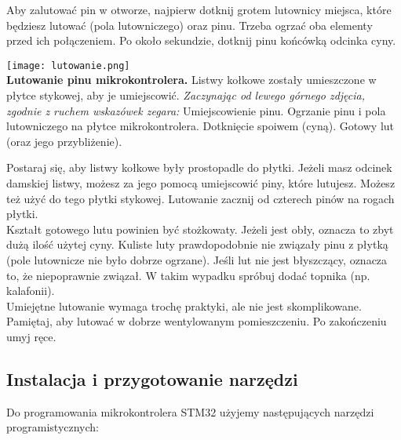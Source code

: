 \documentclass{pdfBooklets}
\begin{document}
Aby zalutować pin w otworze, najpierw dotknij grotem lutownicy
miejsca, które będziesz lutować (pola lutowniczego) oraz pinu. Trzeba ogrzać oba elementy przed ich połączeniem. Po około sekundzie, dotknij pinu końcówką odcinka cyny.
\\


\begin{Ramka}{}\begin{center}
  {\noindent\texttt{[image: lutowanie.png]}}\\
  \small
  \textbf{Lutowanie pinu mikrokontrolera.} Listwy kołkowe zostały umieszczone w płytce stykowej, aby je umiejscowić. \textit{Zaczynając od lewego górnego zdjęcia,
    zgodnie z ruchem wskazówek zegara:} Umiejscowienie pinu. Ogrzanie pinu i pola lutowniczego na płytce mikrokontrolera.
  Dotknięcie spoiwem (cyną).
  Gotowy lut (oraz jego przybliżenie).
\end{center}\end{Ramka}
\vspace*{\baselineskip}

Postaraj się, aby listwy kołkowe były prostopadle do płytki. Jeżeli masz odcinek damskiej listwy, możesz za jego pomocą
umiejscowić piny, które lutujesz. Możesz też użyć do tego płytki stykowej. Lutowanie zacznij od czterech pinów na rogach płytki.
\\

Kształt gotowego lutu powinien być stożkowaty. Jeżeli jest obły, oznacza to zbyt dużą ilość użytej cyny. Kuliste luty prawdopodobnie nie związały pinu z płytką (pole lutownicze nie było dobrze ogrzane). Jeśli lut nie jest błyszczący, oznacza to, że niepoprawnie związał. W takim wypadku spróbuj dodać
topnika (np. kalafonii).\\

Umiejętne lutowanie wymaga trochę praktyki, ale nie jest skomplikowane. Pamiętaj, aby lutować w dobrze wentylowanym
pomieszczeniu. Po zakończeniu umyj ręce.

\subsection{Instalacja i przygotowanie narzędzi}

Do programowania mikrokontrolera STM32 użyjemy następujących narzędzi programistycznych:
\end{document}
